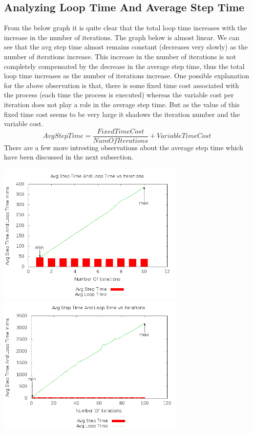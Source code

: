 \documentclass[11pt]{article}
\begin{document}
	\subsection{Analyzing Loop Time And Average Step Time }
	 From the below graph it is quite clear that the total loop time increases with the increase in the number of iterations. The graph below is almost linear. We can see that the avg step time almost remains constant (decreases very slowly) as the number of iterations increase. This increase in the number of iterations is not completely compensated by the decrease in the average step time, thus the total loop time increases as the number of iterations increase. \newline
	One possible explanation for the above observation is that, there is some fixed time cost associated with the process (each time the process is executed) whereas the variable cost per iteration does not play a role in the average step time. But as the value of this fixed time cost seems to be very large it shadows the iteration number and the variable cost.\newline
\begin{equation*} AvgStepTime = \frac{FixedTimeCost}{NumOfIterations} + VariableTimeCost \end{equation*} \newline
There are a few more intresting observations about the average step time which have been discussed in the next subsection.

		\begin{center}\includegraphics[height=7cm]{10_10_plot01.png}\includegraphics[height=7cm]{100_30_plot01.png}\end{center}
\end{document}
